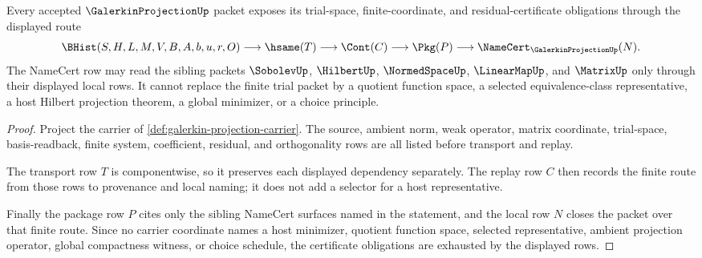 \begin{theorem}
\label{thm:galerkin-projection-namecert-obligations}
Every accepted $\GalerkinProjectionUp$ packet exposes its trial-space, finite-coordinate, and residual-certificate obligations through the displayed route
$$
\BHist(S,H,L,M,V,B,A,b,u,r,O)
\longrightarrow
\hsame(T)
\longrightarrow
\Cont(C)
\longrightarrow
\Pkg(P)
\longrightarrow
\NameCert_{\GalerkinProjectionUp}(N).
$$
The NameCert row may read the sibling packets $\SobolevUp$, $\HilbertUp$, $\NormedSpaceUp$, $\LinearMapUp$, and $\MatrixUp$ only through their displayed local rows. It cannot replace the finite trial packet by a quotient function space, a selected equivalence-class representative, a host Hilbert projection theorem, a global minimizer, or a choice principle.
\end{theorem}
\begin{proof}
Project the carrier of \autoref{def:galerkin-projection-carrier}. The source, ambient norm, weak operator, matrix coordinate, trial-space, basis-readback, finite system, coefficient, residual, and orthogonality rows are all listed before transport and replay.

The transport row $T$ is componentwise, so it preserves each displayed dependency separately. The replay row $C$ then records the finite route from those rows to provenance and local naming; it does not add a selector for a host representative.

Finally the package row $P$ cites only the sibling NameCert surfaces named in the statement, and the local row $N$ closes the packet over that finite route. Since no carrier coordinate names a host minimizer, quotient function space, selected representative, ambient projection operator, global compactness witness, or choice schedule, the certificate obligations are exhausted by the displayed rows.
\end{proof}

